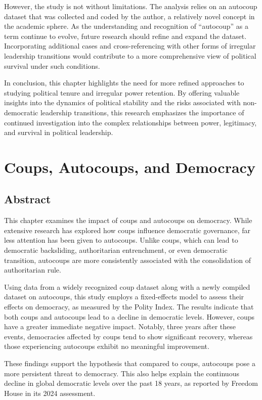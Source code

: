 \documentclass[
  12pt,
]{report}
\begin{document}
However, the study is not without limitations. The analysis relies on an
autocoup dataset that was collected and coded by the author, a
relatively novel concept in the academic sphere. As the understanding
and recognition of ``autocoup'' as a term continue to evolve, future
research should refine and expand the dataset. Incorporating additional
cases and cross-referencing with other forms of irregular leadership
transitions would contribute to a more comprehensive view of political
survival under such conditions.

In conclusion, this chapter highlights the need for more refined
approaches to studying political tenure and irregular power retention.
By offering valuable insights into the dynamics of political stability
and the risks associated with non-democratic leadership transitions,
this research emphasizes the importance of continued investigation into
the complex relationships between power, legitimacy, and survival in
political leadership.

\chapter{Coups, Autocoups, and
Democracy}\label{coups-autocoups-and-democracy}

\section{Abstract}\label{abstract-4}

This chapter examines the impact of coups and autocoups on democracy.
While extensive research has explored how coups influence democratic
governance, far less attention has been given to autocoups. Unlike
coups, which can lead to democratic backsliding, authoritarian
entrenchment, or even democratic transition, autocoups are more
consistently associated with the consolidation of authoritarian rule.

Using data from a widely recognized coup dataset along with a newly
compiled dataset on autocoups, this study employs a fixed-effects model
to assess their effects on democracy, as measured by the Polity Index.
The results indicate that both coups and autocoups lead to a decline in
democratic levels. However, coups have a greater immediate negative
impact. Notably, three years after these events, democracies affected by
coups tend to show significant recovery, whereas those experiencing
autocoups exhibit no meaningful improvement.

These findings support the hypothesis that compared to coups, autocoups
pose a more persistent threat to democracy. This also helps explain the
continuous decline in global democratic levels over the past 18 years,
as reported by Freedom House in its 2024 assessment.
\end{document}
